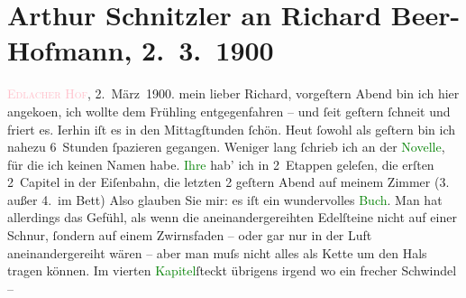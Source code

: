 

               \section[Arthur Schnitzler an Richard Beer-Hofmann, 2. 3. 1900]{ Arthur Schnitzler an Richard Beer-Hofmann, 2. 3. 1900}\nopagebreak{}\rehead{ }\normalsize\beginnumbering{} \toendnotes[C]{\smallbreak\pagebreak[2]} 
\toendnotes[C]{\smallbreak}\pstart
           \raggedleft{}{\pb}\textcolor{pink}{\textsc{Edlacher Hof}}{}\ledrightnote{\textcolor{pink}{Hotel Edlacherhof}},\pend
           \pstart
           \raggedleft{}2. März 1900.\pend
           \pstart
           mein lieber Richard, vorgeſtern Abend bin ich hier angeko{\geminationm}en, ich wollte dem Frühling entgegenfahren – und ſeit
               geſtern ſchneit und friert es. I{\geminationm}erhin iſt es in den
               Mittagſtunden ſchön. Heut ſowohl als geſtern bin ich nahezu 6 Stunden ſpazieren
               gegangen. Weniger lang {\pb}ſchrieb ich an der \textcolor{green}{Novelle}{}, für die ich keinen Namen
               habe.\pend
           \pstart
           \textcolor{green}{Ihre}{} hab’ ich in 2 Etappen
               geleſen, die erſten 2 Capitel in der Eiſenbahn, die letzten 2 geſtern Abend auf
               meinem Zimmer (3. außer 4. im Bett) Also glauben Sie mir: es iſt ein
               wundervolles \textcolor{green}{Buch}{}. Man hat
               allerdings das Gefühl, als wenn die aneinandergereihten Edelſteine nicht auf einer
               Schnur, {\pb}ſondern auf einem Zwirnsfaden – oder gar nur
               in der Luft aneinandergereiht wären – aber man muſs nicht alles als Kette um den Hals
               tragen können. Im vierten \textcolor{green}{Kapitel}{}ſteckt übrigens irgend wo ein frecher Schwindel –
